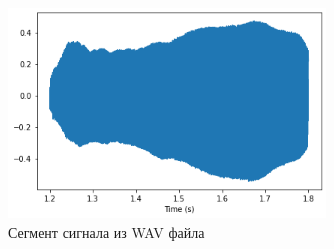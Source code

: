 \documentclass[a4paper, 12pt]{report}
\begin{document}
	\begin{figure}[H]
		\centering
		\includegraphics[width=0.75\textwidth]{segment_file.png}
		\caption{Сегмент сигнала из  WAV файла}
		\label{fig:segment_file}
	\end{figure}
\end{document}
